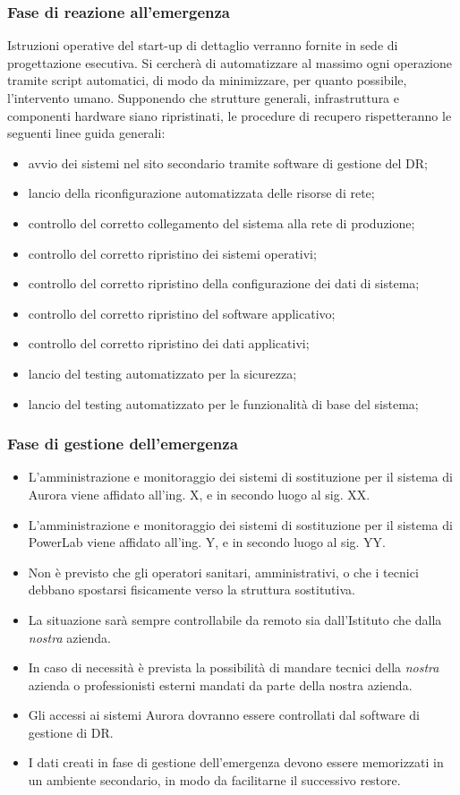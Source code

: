 \subsubsection{Fase di reazione all’emergenza}
Istruzioni operative del start-up di dettaglio verranno fornite in sede di progettazione esecutiva. Si cercherà di automatizzare al massimo ogni operazione tramite script automatici, di modo da minimizzare, per quanto possibile, l'intervento umano. 
Supponendo che strutture generali, infrastruttura e componenti hardware siano ripristinati, le procedure di recupero rispetteranno le seguenti linee guida generali:
\begin{itemize}
\item avvio dei sistemi nel sito secondario tramite software di gestione del DR;
\item lancio della riconfigurazione automatizzata delle risorse di rete;
\item controllo del corretto collegamento del sistema alla rete di produzione;
\item controllo del corretto ripristino dei sistemi operativi;
\item  controllo del corretto ripristino della configurazione dei dati di sistema;
\item controllo del corretto ripristino del software applicativo;
\item  controllo del corretto ripristino dei dati applicativi;
\item lancio del testing automatizzato per la sicurezza;
\item lancio del testing automatizzato per le funzionalità di base del sistema;
\end{itemize}

\subsubsection{Fase di gestione dell’emergenza}
\begin{itemize}
\item L'amministrazione e monitoraggio dei sistemi di sostituzione per il sistema di Aurora viene affidato all'ing. X, e in secondo luogo al sig. XX.
\item L'amministrazione e monitoraggio dei sistemi di sostituzione per il sistema di PowerLab viene affidato all'ing. Y, e in secondo luogo al sig. YY.
\item Non è previsto che gli operatori sanitari, amministrativi, o che i tecnici debbano spostarsi fisicamente verso la struttura sostitutiva.
\item La situazione sarà sempre controllabile da remoto sia dall'Istituto che dalla \textit{nostra} azienda.
\item In caso di necessità è prevista la possibilità di mandare tecnici della \textit{nostra} azienda o professionisti esterni mandati da parte della nostra azienda.
\item Gli accessi ai sistemi Aurora dovranno essere controllati dal software di gestione di DR.
\item I dati creati in fase di gestione dell'emergenza devono essere memorizzati in un ambiente secondario, in modo da facilitarne il successivo restore.
\end{itemize}


